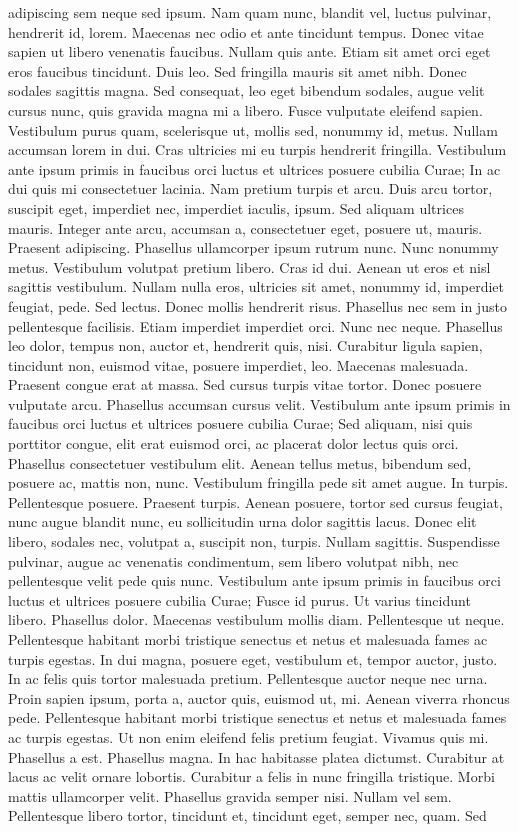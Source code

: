 adipiscing sem neque sed ipsum. Nam quam nunc, blandit vel, luctus pulvinar, hendrerit id, lorem. Maecenas nec odio et ante tincidunt tempus. Donec vitae sapien ut libero venenatis faucibus. Nullam quis ante. Etiam sit amet orci eget eros faucibus tincidunt. Duis leo. Sed fringilla mauris sit amet nibh. Donec sodales sagittis magna. Sed consequat, leo eget bibendum sodales, augue velit cursus nunc, quis gravida magna mi a libero. Fusce vulputate eleifend sapien. Vestibulum purus quam, scelerisque ut, mollis sed, nonummy id, metus. Nullam accumsan lorem in dui. Cras ultricies mi eu turpis hendrerit fringilla. Vestibulum ante ipsum primis in faucibus orci luctus et ultrices posuere cubilia Curae; In ac dui quis mi consectetuer lacinia. Nam pretium turpis et arcu. Duis arcu tortor, suscipit eget, imperdiet nec, imperdiet iaculis, ipsum. Sed aliquam ultrices mauris. Integer ante arcu, accumsan a, consectetuer eget, posuere ut, mauris. Praesent adipiscing. Phasellus ullamcorper ipsum rutrum nunc. Nunc nonummy metus. Vestibulum volutpat pretium libero. Cras id dui. Aenean ut eros et nisl sagittis vestibulum. Nullam nulla eros, ultricies sit amet, nonummy id, imperdiet feugiat, pede. Sed lectus. Donec mollis hendrerit risus. Phasellus nec sem in justo pellentesque facilisis. Etiam imperdiet imperdiet orci. Nunc nec neque. Phasellus leo dolor, tempus non, auctor et, hendrerit quis, nisi. Curabitur ligula sapien, tincidunt non, euismod vitae, posuere imperdiet, leo. Maecenas malesuada. Praesent congue erat at massa. Sed cursus turpis vitae tortor. Donec posuere vulputate arcu. Phasellus accumsan cursus velit. Vestibulum ante ipsum primis in faucibus orci luctus et ultrices posuere cubilia Curae; Sed aliquam, nisi quis porttitor congue, elit erat euismod orci, ac placerat dolor lectus quis orci. Phasellus consectetuer vestibulum elit. Aenean tellus metus, bibendum sed, posuere ac, mattis non, nunc. Vestibulum fringilla pede sit amet augue. In turpis. Pellentesque posuere. Praesent turpis. Aenean posuere, tortor sed cursus feugiat, nunc augue blandit nunc, eu sollicitudin urna dolor sagittis lacus. Donec elit libero, sodales nec, volutpat a, suscipit non, turpis. Nullam sagittis. Suspendisse pulvinar, augue ac venenatis condimentum, sem libero volutpat nibh, nec pellentesque velit pede quis nunc. Vestibulum ante ipsum primis in faucibus orci luctus et ultrices posuere cubilia Curae; Fusce id purus. Ut varius tincidunt libero. Phasellus dolor. Maecenas vestibulum mollis diam. Pellentesque ut neque. Pellentesque habitant morbi tristique senectus et netus et malesuada fames ac turpis egestas. In dui magna, posuere eget, vestibulum et, tempor auctor, justo. In ac felis quis tortor malesuada pretium. Pellentesque auctor neque nec urna. Proin sapien ipsum, porta a, auctor quis, euismod ut, mi. Aenean viverra rhoncus pede. Pellentesque habitant morbi tristique senectus et netus et malesuada fames ac turpis egestas. Ut non enim eleifend felis pretium feugiat. Vivamus quis mi. Phasellus a est. Phasellus magna. In hac habitasse platea dictumst. Curabitur at lacus ac velit ornare lobortis. Curabitur a felis in nunc fringilla tristique. Morbi mattis ullamcorper velit. Phasellus gravida semper nisi. Nullam vel sem. Pellentesque libero tortor, tincidunt et, tincidunt eget, semper nec, quam. Sed 